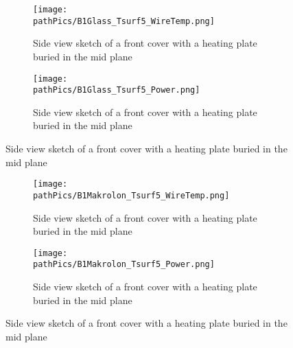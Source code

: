 \begin{figure}[ht]
\centering
\begin{minipage}[b]{0.48\linewidth}
\begin{figure} [H]
	\centering
	\texttt{[image: \\pathPics/B1Glass\_Tsurf5\_WireTemp.png]}
	\caption[Front Cover Heat Transfer Model]{Side view sketch of a front cover with a heating plate buried in the mid plane }
\end{figure}

\end{minipage}
\quad
\begin{minipage}[b]{0.48\linewidth}
\begin{figure} [H]
	\centering
	\texttt{[image: \\pathPics/B1Glass\_Tsurf5\_Power.png]}
	\caption[Front Cover Heat Transfer Model]{Side view sketch of a front cover with a heating plate buried in the mid plane}
\end{figure}
\end{minipage}
\end{figure}


\begin{figure}[ht]
\centering
\begin{minipage}[b]{0.48\linewidth}
\begin{figure} [H]
	\centering
	\texttt{[image: \\pathPics/B1Makrolon\_Tsurf5\_WireTemp.png]}
	\caption[Front Cover Heat Transfer Model]{Side view sketch of a front cover with a heating plate buried in the mid plane }
\end{figure}

\end{minipage}
\quad
\begin{minipage}[b]{0.48\linewidth}
\begin{figure} [H]
	\centering
	\texttt{[image: \\pathPics/B1Makrolon\_Tsurf5\_Power.png]}
	\caption[Front Cover Heat Transfer Model]{Side view sketch of a front cover with a heating plate buried in the mid plane}
\end{figure}
\end{minipage}
\end{figure}

 


